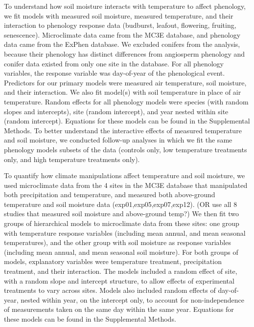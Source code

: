 \documentclass{article}
\begin{document}
\par To understand how soil moisture interacts with temperature to affect phenology, we fit models with measured soil moisture, measured temperature, and their interaction to phenology response data (budburst, leafout, flowering, fruiting, senescence). Microclimate data came from the MC3E database, and phenology data came from the ExPhen database. We excluded conifers from the analysis, because their phenology has distinct differences from angiosperm phenology \cite{polgar2014} and conifer data existed from only one site in the database. For all phenology variables, the response variable was day-of-year of the phenological event. Predictors for our primary models were measured air temperature, soil moisture, and their interaction. We also fit model(s) with soil temperature in place of air temperature. Random effects for all phenology models were species (with random slopes and intercepts), site (random intercept), and year nested within site (random intercept). Equations for these models can be found in the Supplemental Methods. 
To better understand the interactive effects of measured temperature and soil moisture, we conducted follow-up analyses in which we fit the same phenology models subsets of the data (controls only, low temperature treatments only, and high temperature treatments only).
\par To quantify how climate manipulations affect temperature and soil moisture, we used microclimate data from the 4 sites in the MC3E database that manipulated both precipitation and temperature, and measured both above-ground temperature and soil moisture data (exp01,exp05,exp07,exp12). (OR use all 8 studies that measured soil moisture and above-ground temp?) We then fit two groups of hierarchical models to microclimate data from these sites: one group with temperature response variables (including mean annual, and mean seasonal temperatures), and the other group with soil moisture as response variables (including mean annual, and mean seasonal soil moisture). For both groups of models, explanatory variables were temperature treatment, precipitation treatment, and their interaction. The models included a random effect of site, with a random slope and intercept structure, to allow effects of experimental treatments to vary across sites. Models also included random effects of day-of-year, nested within year, on the intercept only, to account for non-independence of measurements taken on the same day within the same year. Equations for these models can be found in the Supplemental Methods. 


\clearpage

\end{document}
